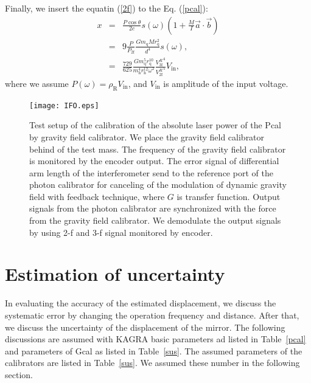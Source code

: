 \documentclass[A4]{spie}  %
\begin{document}
Finally, we insert the equatin (\ref{2f}) to the Eq. (\ref{pcal}):
\begin{eqnarray}
x&=&\frac{P \cos{\theta}}{2c} s(\omega)\left(1+\frac{M}{I}\vec{a} \cdot \vec{b} \right) \\
 &=&9\frac{P}{P_{\mathrm{2f}}}\frac{Gm_{\mathrm{q}} M r_{\mathrm{q}}^2}{d^4}s(\omega) , \\
 &=&\frac{729}{625} \frac{G m^5_{\mathrm{q}} r_{\mathrm{q}}^{10}}{m^4_{\mathrm{h}} r_{\mathrm{h}}^{12} \omega^2} \frac{{V_{\mathrm{3f}}^{R}}^4}{{V_{\mathrm{2f}}^{R}}^5}V_{\mathrm{in}} , \label{pcal_new}
\end{eqnarray}
where we assume $P(\omega)=\rho_{\mathrm{R}} V_{\mathrm{in}}$, and $V_{\mathrm{in}}$ is amplitude of the input voltage.
\begin{figure}
\begin{center}
\texttt{[image: IFO.eps]}
\caption{Test setup of the calibration of the absolute laser power of the Pcal by gravity field calibrator. We place the gravity field calibrator behind of the test mass. The frequency of the gravity field calibrator is monitored by the encoder output. The error signal of differential arm length of the interferometer send to the reference port of the photon calibrator for canceling of the modulation of dynamic gravity field with feedback technique, where $G$ is transfer function. Output signals from the photon calibrator are synchronized with the force from the gravity field calibrator. We demodulate the output signals by using 2-f and 3-f signal monitored by encoder.}
\label{fig:IFO}
\end{center}
\end{figure}

\section{Estimation of uncertainty} \label{sec:EST}
In evaluating the accuracy of the estimated displacement, we discuss the systematic error by changing the operation frequency and distance. After that, we discuss the uncertainty of the displacement of the mirror. 
The following discussions are assumed with KAGRA basic parameters ad listed in Table~\ref{pcal} and parameters of Gcal as listed in Table~\ref{sus}. The assumed parameters of the calibrators are listed in Table~\ref{sus}. We assumed these number in the following section.
\end{document}

